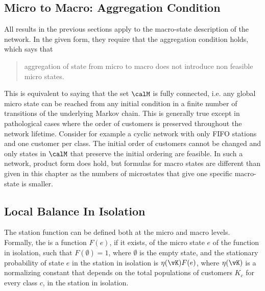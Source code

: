 \begin{petit}
\subsection{Micro to Macro: Aggregation
Condition} \label{sec-aggreg} All results in the
previous sections apply to the macro-state
description of the network. In the given form,
they require that the aggregation condition
holds, which says that
  \begin{quote}
  aggregation of state from
micro to macro does not introduce non feasible
micro states.
 \end{quote}
This is equivalent to saying that the set $\calM$
is fully connected, i.e. any global micro state
can be reached from any initial condition in a
finite number of transitions of the underlying
Markov chain. This is generally true except in
pathological cases where the order of customers
is preserved throughout the network lifetime.
Consider for example a cyclic network with only
FIFO stations and one customer per class. The
initial order of customers cannot be changed and
only states in $\calM$ that preserve the initial
ordering are feasible. In such a network, product
form does hold, but formulas for macro states
are different than given in this chapter as the numbers of microstates that
give one specific macro-state is smaller.


\subsection{Local Balance In Isolation}
The station function can be defined both at the micro and macro
levels. Formally, the  is a
function $F(e)$, if it exists, of the micro state $e$ of the
function in isolation, such that $F(\emptyset)= 1$, where $\emptyset$ is the empty state, and the
stationary probability of state $e$ in the station in isolation
is $\eta(\vK) F(e)$, where $\eta(\vK)$ is a normalizing
constant that depends on the total populations of customers
$K_c$ for every class $c$, in the station in isolation.


\end{petit}
